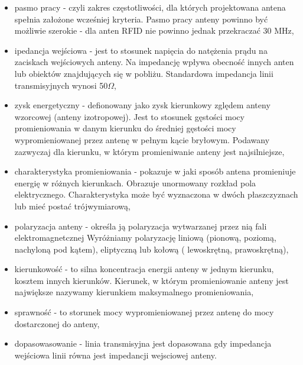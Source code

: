 \begin{itemize}\setlength{\itemsep}{0pt}

	\item pasmo pracy - czyli zakres częstotliwości, dla których projektowana antena spełnia założone wcześniej kryteria. Pasmo pracy anteny powinno być możliwie szerokie - dla anten RFID nie powinno jednak przekraczać 30 MHz,

	\item ipedancja wejściowa - jest to stosunek napięcia do natężenia prądu na zaciskach wejściowych anteny. Na impedancję wpływa obecność innych anten lub obiektów znajdujących się w pobliżu.
	Standardowa impedancja linii transmisyjnych wynosi 50\(\Omega\),

	\item zysk energetyczny - defionowany jako zysk kierunkowy zględem anteny wzorcowej (anteny izotropowej).
	Jest to stosunek gęstości mocy promieniowania w danym kierunku do średniej gęstości mocy wypromieniowanej przez antenę w pełnym kącie bryłowym. Podawany zazwyczaj dla kierunku, w którym promieniwanie anteny jest najsilniejsze, 

	\item charakterystyka promieniowania - pokazuje w jaki sposób antena promieniuje energię w różnych kierunkach. Obrazuje unormowany rozkład pola elektrycznego. Charakterystyka może być wyznaczona w dwóch płaszczyznach lub mieć postać trójwymiarową,

	\item polaryzacja anteny - określa ją polaryzacja wytwarzanej przez nią fali elektromagnetcznej 
	Wyróżniamy polaryzację liniową (pionową, poziomą, nachyloną pod kątem), eliptyczną lub kołową ( lewoskrętną, prawoskrętną),

	\item kierunkowość - to silna koncentracja energii anteny w jednym kierunku, kosztem innych kierunków. Kierunek, w którym promieniowanie anteny jest największe nazywamy kierunkiem maksymalnego promieniowania,

	\item sprawność - to storunek mocy wypromieniowanej przez antenę do mocy dostarczonej do anteny,

	\item dopasowasowanie - linia transmisyjna jest dopasowana gdy impedancja wejściowa linii równa jest impedancji wejsciowej anteny. 

\end{itemize}

\newpage
